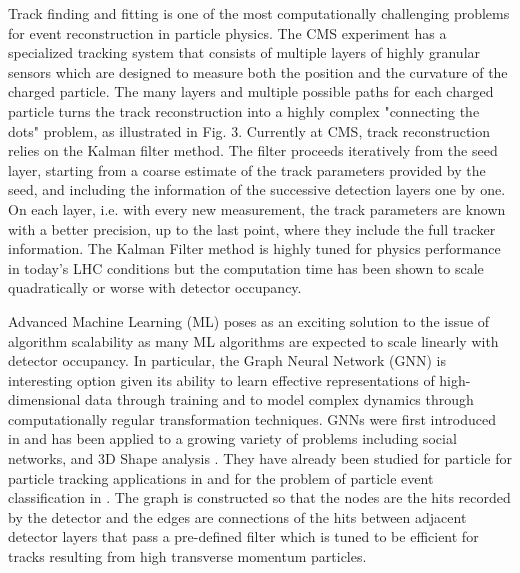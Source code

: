 \documentclass[preprint,12pt]{elsarticle}
\begin{document}
Track finding and fitting is one of the most computationally challenging 
problems for event reconstruction in particle physics.
The CMS experiment has 
a specialized tracking system that consists of multiple layers of highly granular 
sensors which are designed to measure both the position and the curvature of the 
charged particle. The many layers and multiple possible paths for each charged 
particle turns the track reconstruction into a highly complex "connecting the dots" 
problem, as illustrated in Fig. 3.
Currently at CMS, track reconstruction relies on the Kalman filter method. 
The filter proceeds iteratively from the seed layer, starting from a coarse estimate of 
the track parameters provided by the seed, and including the
information of the successive detection layers one by one. 
On each layer, i.e. with every new measurement, the track parameters 
are known with a better precision, up to the last point, where they 
include the full tracker information.
The Kalman Filter method is highly tuned for physics performance in today’s LHC 
conditions but the computation time has been shown to scale quadratically or worse with 
detector occupancy\cite{Cerati_2015}. 


Advanced Machine Learning (ML) poses as an exciting solution to the issue of 
algorithm scalability as many ML algorithms are expected to scale linearly %
with detector occupancy.
In particular, the Graph Neural Network (GNN) is interesting option
given its ability to learn effective representations of high-dimensional data 
through training and to model complex dynamics through computationally regular 
transformation techniques.
GNNs were first introduced in \cite{4700287}
and has been applied to a growing variety of problems including social networks,
and 3D Shape analysis \cite{zhou2018graph}. They have already been studied for particle for particle tracking
applications in \cite{farrell2018novel} and for the problem
of particle event classification in \cite{martinez2018pileup,qu2019particlenet}.
The graph is constructed so that the nodes are the hits recorded by the detector and the 
edges are connections of the hits between adjacent detector layers that pass a pre-defined
filter which is tuned to be efficient for tracks resulting from high transverse momentum
particles. 
\end{document}
